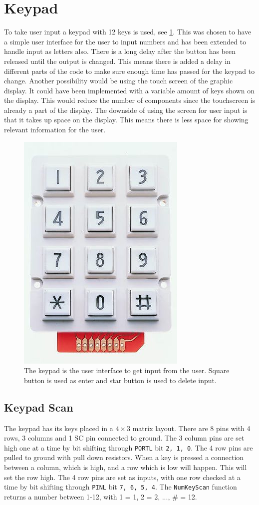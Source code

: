 \section{Keypad}
To take user input a keypad with 12 keys is used, see \cref{fig:keypad}. \cite{rspro} 
This was chosen to have a simple user interface for the user to input numbers and has been extended to handle input as letters also.
There is a long delay after the button has been released until the output is changed. 
This means there is added a delay in different parts of the code to make sure enough time has passed for the keypad to change. 
Another possibility would be using the touch screen of the graphic display. 
It could have been implemented with a variable amount of keys shown on the display. 
This would reduce the number of components since the touchscreen is already a part of the display. 
The downside of using the screen for user input is that it takes up space on the display. This means there is less space for showing relevant information for the user.

\begin{figure}[H]
\centering
\includegraphics[width=0.3\linewidth]{graphics/keypad}
\caption{The keypad is the user interface to get input from the user. Square button is used as enter and star button is used to delete input.}
\label{fig:keypad}
\end{figure}


\subsection{Keypad Scan}
The keypad has its keys placed in a $4\times3$ matrix layout. 
There are 8 pins with 4 rows, 3 columns and 1 SC pin connected to ground. 
The 3 column pins are set high one at a time by bit shifting through \texttt{PORTL} bit \texttt{2, 1, 0}. 
The 4 row pins are pulled to ground with pull down resistors.
When a key is pressed a connection between a column, which is high, and a row which is low will happen.
This will set the row high. 
The 4 row pins are set as inputs, with one row checked at a time by bit shifting through \texttt{PINL} bit \texttt{7, 6, 5, 4}. \cite{matrixkeypad}
The \texttt{NumKeyScan} function returns a number between 1-12, with 1 = 1, 2 = 2, ..., \# = 12. 

